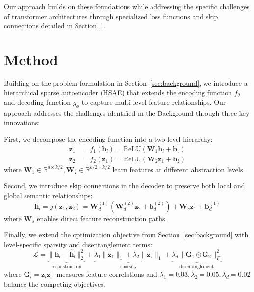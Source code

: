 \documentclass{article} %
\begin{document}
Our approach builds on these foundations while addressing the specific challenges of transformer architectures through specialized loss functions and skip connections detailed in Section~\ref{sec:method}.

\section{Method}
\label{sec:method}

Building on the problem formulation in Section~\ref{sec:background}, we introduce a hierarchical sparse autoencoder (HSAE) that extends the encoding function $f_\theta$ and decoding function $g_\phi$ to capture multi-level feature relationships. Our approach addresses the challenges identified in the Background through three key innovations:

First, we decompose the encoding function into a two-level hierarchy:
\begin{align}
    \mathbf{z}_1 &= f_1(\mathbf{h}_l) = \text{ReLU}(\mathbf{W}_1\mathbf{h}_l + \mathbf{b}_1) \\
    \mathbf{z}_2 &= f_2(\mathbf{z}_1) = \text{ReLU}(\mathbf{W}_2\mathbf{z}_1 + \mathbf{b}_2)
\end{align}
where $\mathbf{W}_1 \in \mathbb{R}^{d \times k/2}, \mathbf{W}_2 \in \mathbb{R}^{k/2 \times k/2}$ learn features at different abstraction levels.

Second, we introduce skip connections in the decoder to preserve both local and global semantic relationships:
\begin{equation}
    \hat{\mathbf{h}}_l = g(\mathbf{z}_1, \mathbf{z}_2) = \mathbf{W}_d^{(1)}(\mathbf{W}_d^{(2)}\mathbf{z}_2 + \mathbf{b}_d^{(2)}) + \mathbf{W}_s\mathbf{z}_1 + \mathbf{b}_d^{(1)}
\end{equation}
where $\mathbf{W}_s$ enables direct feature reconstruction paths.

Finally, we extend the optimization objective from Section~\ref{sec:background} with level-specific sparsity and disentanglement terms:
\begin{equation}
    \mathcal{L} = \underbrace{\|\mathbf{h}_l - \hat{\mathbf{h}}_l\|_2^2}_{\text{reconstruction}} + \underbrace{\lambda_1\|\mathbf{z}_1\|_1 + \lambda_2\|\mathbf{z}_2\|_1}_{\text{sparsity}} + \underbrace{\lambda_d\|\mathbf{G}_1 \odot \mathbf{G}_2\|_F^2}_{\text{disentanglement}}
\end{equation}
where $\mathbf{G}_i = \mathbf{z}_i\mathbf{z}_i^\top$ measures feature correlations and $\lambda_1=0.03, \lambda_2=0.05, \lambda_d=0.02$ balance the competing objectives.
\end{document}
